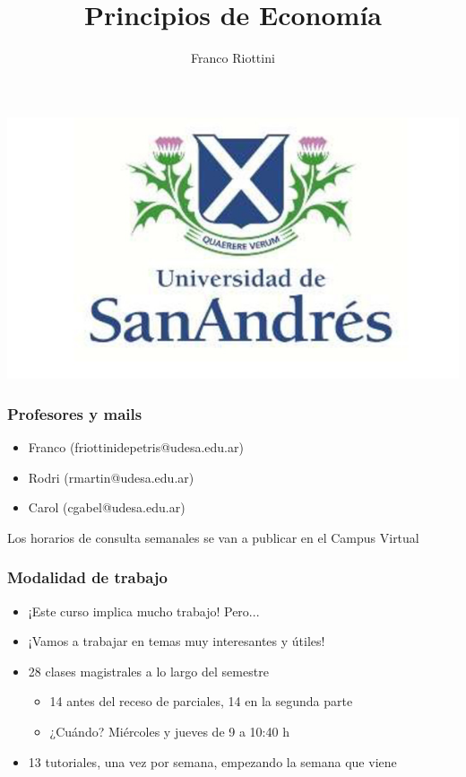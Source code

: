 \documentclass{beamer}
\title[Principios de Economía]{Principios de Economía}
\date{}
\author[Riottini]{Franco Riottini}
\institute[]{Universidad de San Andrés \\
2024}
\begin{document}
\begin{frame}

    \titlepage
    \centering
    \includegraphics[scale=0.25]{../Figures/logoUDESA.jpg} 

\end{frame}

\begin{frame}
\frametitle{Profesores y mails}
\begin{itemize}
    \item Franco (friottinidepetris@udesa.edu.ar)
    \item Rodri (rmartin@udesa.edu.ar)
    \item Carol (cgabel@udesa.edu.ar)
\end{itemize}
Los horarios de consulta semanales se van a publicar en el Campus Virtual
\end{frame}

\begin{frame}
\frametitle{Modalidad de trabajo}
\begin{itemize}
    \item ¡Este curso implica mucho trabajo! Pero...  \vspace{2mm}
    \item ¡Vamos a trabajar en temas muy interesantes y útiles!  \vspace{2mm}
    \item 28 clases magistrales a lo largo del semestre 
\begin{itemize}
        \item 14 antes del receso de parciales, 14 en la segunda parte
        \item ¿Cuándo? Miércoles y jueves de 9 a 10:40 h
\end{itemize}
    \item 13 tutoriales, una vez por semana, empezando la semana que viene 
\end{itemize}
\end{frame}
\end{document}

